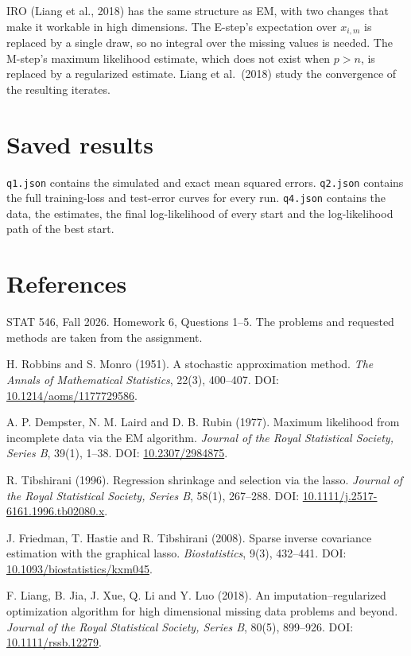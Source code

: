 \documentclass[11pt]{article}
\begin{document}
IRO (Liang et al., 2018) has the same structure as EM, with two changes that make it workable in high
dimensions. The E-step's expectation over $x_{i,m}$ is replaced by a single draw, so no integral over the missing
values is needed. The M-step's maximum likelihood estimate, which does not exist when $p>n$, is replaced by a
regularized estimate. Liang et al.\ (2018) study the convergence of the resulting iterates.

\newpage
\section*{Saved results}

\texttt{q1.json} contains the simulated and exact mean squared errors. \texttt{q2.json} contains the full
training-loss and test-error curves for every run. \texttt{q4.json} contains the data, the estimates, the final
log-likelihood of every start and the log-likelihood path of the best start.

\section*{References}
\sloppy

STAT 546, Fall 2026. Homework 6, Questions 1--5. The problems and requested methods are taken from the assignment.

H. Robbins and S. Monro (1951). A stochastic approximation method. \emph{The Annals of Mathematical Statistics},
22(3), 400--407. DOI: \href{https://doi.org/10.1214/aoms/1177729586}{10.1214/aoms/1177729586}.

A. P. Dempster, N. M. Laird and D. B. Rubin (1977). Maximum likelihood from incomplete data via the EM algorithm.
\emph{Journal of the Royal Statistical Society, Series B}, 39(1), 1--38.
DOI: \href{https://doi.org/10.2307/2984875}{10.2307/2984875}.

R. Tibshirani (1996). Regression shrinkage and selection via the lasso. \emph{Journal of the Royal Statistical
Society, Series B}, 58(1), 267--288.
DOI: \href{https://doi.org/10.1111/j.2517-6161.1996.tb02080.x}{10.1111/j.2517-6161.1996.tb02080.x}.

J. Friedman, T. Hastie and R. Tibshirani (2008). Sparse inverse covariance estimation with the graphical lasso.
\emph{Biostatistics}, 9(3), 432--441. DOI: \href{https://doi.org/10.1093/biostatistics/kxm045}{10.1093/biostatistics/kxm045}.

F. Liang, B. Jia, J. Xue, Q. Li and Y. Luo (2018). An imputation--regularized optimization algorithm for high
dimensional missing data problems and beyond. \emph{Journal of the Royal Statistical Society, Series B}, 80(5),
899--926. DOI: \href{https://doi.org/10.1111/rssb.12279}{10.1111/rssb.12279}.
\end{document}
